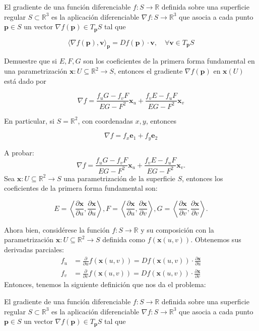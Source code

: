\begin{problema}
    El gradiente de una función diferenciable $f: S \rightarrow \mathbb{R}$ definida sobre una superficie regular $S \subset \mathbb{R}^{3}$ es la aplicación diferenciable $\nabla f: S \rightarrow \mathbb{R}^{3}$ que asocia a cada punto $\mathbf{p} \in S$ un vector $\nabla f(\mathbf{p}) \in T_{\mathbf{p}} S$ tal que

$$
\langle\nabla f(\mathbf{p}), \mathbf{v}\rangle_{\mathbf{p}}=D f(\mathbf{p}) \cdot \mathbf{v}, \quad \forall \mathbf{v} \in T_{\mathbf{p}} S
$$

Demuestre que si $E, F, G$ son los coeficientes de la primera forma fundamental en una parametrización $\mathbf{x}: U \subseteq \mathbb{R}^{2} \rightarrow S$, entonces el gradiente $\nabla f(\mathbf{p})$ en $\mathbf{x}(U)$ está dado por

$$
\nabla f=\frac{f_{u} G-f_{v} F}{E G-F^{2}} \mathbf{x}_{u}+\frac{f_{v} E-f_{u} F}{E G-F^{2}} \mathbf{x}_{v}
$$

En particular, si $S=\mathbb{R}^{2}$, con coordenadas $x, y$, entonces

$$
\nabla f=f_{x} \mathbf{e}_{1}+f_{y} \mathbf{e}_{2}
$$



\begin{dem} A probar: 
    $$
\nabla f=\frac{f_{u} G-f_{v} F}{E G-F^{2}} \mathbf{x}_{u}+\frac{f_{v} E-f_{u} F}{E G-F^{2}} \mathbf{x}_{v}.
$$
    Sea $\mathbf{x}: U \subseteq \mathbb{R}^{2} \rightarrow S$ una parametrización de la superficie $S$, entonces los coeficientes de la primera forma fundamental son:

$$ E=\left\langle\frac{\partial \mathbf{x}}{\partial u}, \frac{\partial \mathbf{x}}{\partial u}\right\rangle, F=\left\langle\frac{\partial \mathbf{x}}{\partial u}, \frac{\partial \mathbf{x}}{\partial v}\right\rangle, G=\left\langle\frac{\partial \mathbf{x}}{\partial v}, \frac{\partial \mathbf{x}}{\partial v}\right\rangle. $$

Ahora bien, considérese la función $f: S \rightarrow \mathbb{R}$ y su composición con la parametrización $\mathbf{x}: U \subseteq \mathbb{R}^{2} \rightarrow S$ definida como  $f(\mathbf{x}(u,v))$. Obtenemos sus derivadas parciales: 
\begin{align*}
    f_u &= \frac{\partial}{\partial u}f(\mathbf{x}(u,v)) = Df(\mathbf{x}(u,v))\cdot\frac{\partial\mathbf{x}}{\partial u}\\
    f_v &= \frac{\partial}{\partial v}f(\mathbf{x}(u,v)) = Df(\mathbf{x}(u,v))\cdot\frac{\partial\mathbf{x}}{\partial v} 
\end{align*}
Entonces, tenemos la siguiente definición que nos da el problema: 
\begin{cajita}
    El gradiente de una función diferenciable $f: S \rightarrow \mathbb{R}$ definida sobre una superficie regular $S \subset \mathbb{R}^{3}$ es la aplicación diferenciable $\nabla f: S \rightarrow \mathbb{R}^{3}$ que asocia a cada punto $\mathbf{p} \in S$ un vector $\nabla f(\mathbf{p}) \in T_{\mathbf{p}} S$ tal que


\end{cajita}
\end{dem}
\end{problema}
